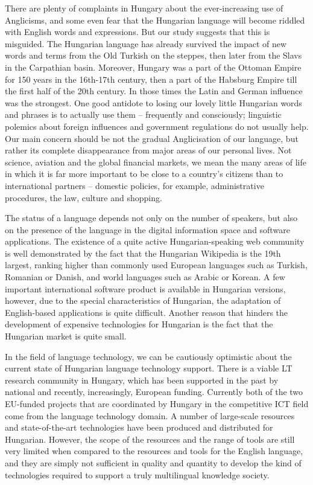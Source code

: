 \begin{multicols}{2}
There are plenty of complaints in Hungary about the ever-increasing use of Anglicisms, and some even fear that the Hungarian language will become riddled with English words and expressions. But our study suggests that this is misguided. The Hungarian language has already survived the impact of new words and terms from the Old Turkish on the steppes, then later from the Slavs in the Carpathian basin. Moreover, Hungary was a part of the Ottoman Empire for 150 years in the 16th-17th century, then a part of the Habsburg Empire till the first half of the 20th century. In those times the Latin and German influence was the strongest. One good antidote to losing our lovely little Hungarian words and phrases is to actually use them -- frequently and consciously; linguistic polemics about foreign influences and government regulations do not usually help. Our main concern should be not the gradual Anglicisation of our language, but rather its complete disappearance from major areas of our personal lives. Not science, aviation and the global financial markets, we mean the many areas of life in which it is far more important to be close to a country’s citizens than to international partners -- domestic policies, for example, administrative procedures, the law, culture and shopping.

The status of a language depends not only on the number of speakers, but also on the presence of the language in the digital information space and software applications. The existence of a quite active Hungarian-speaking web community is well demonstrated by the fact that the Hungarian Wikipedia is the 19th largest, ranking higher than commonly used European languages such as Turkish, Romanian or Danish, and world languages such as Arabic or Korean. A few important international software product is available in Hungarian versions, however, due to the special characteristics of Hungarian, the adaptation of English-based applications is quite difficult. Another reason that hinders the development of expensive technologies for Hungarian is the fact that the Hungarian market is quite small. 

In the field of language technology, we can be cautiously optimistic about the current state of Hungarian language technology support. There is a viable LT research community in Hungary, which has been supported in the past by national and recently, increasingly, European funding.  Currently both of the two EU-funded projects that are coordinated by Hungary in the competitive ICT field come from the language technology domain. A number of large-scale resources and state-of-the-art technologies have been produced and distributed for Hungarian. However, the scope of the resources and the range of tools are still very limited when compared to the resources and tools for the English language, and they are simply not sufficient in quality and quantity to develop the kind of technologies required to support a truly multilingual knowledge society.


\end{multicols}
